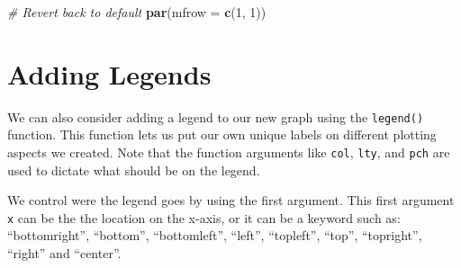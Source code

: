 \documentclass[
]{book}
\newenvironment{Shaded}{\begin{snugshade}}{\end{snugshade}}
\newcommand{\CommentTok}[1]{\textcolor[rgb]{0.56,0.35,0.01}{\textit{#1}}}
\newcommand{\DataTypeTok}[1]{\textcolor[rgb]{0.13,0.29,0.53}{#1}}
\newcommand{\DecValTok}[1]{\textcolor[rgb]{0.00,0.00,0.81}{#1}}
\newcommand{\KeywordTok}[1]{\textcolor[rgb]{0.13,0.29,0.53}{\textbf{#1}}}
\newcommand{\NormalTok}[1]{#1}
\newcommand{\OperatorTok}[1]{\textcolor[rgb]{0.81,0.36,0.00}{\textbf{#1}}}
\newcommand{\StringTok}[1]{\textcolor[rgb]{0.31,0.60,0.02}{#1}}
\begin{document}
\begin{Shaded}
\begin{Highlighting}[]
\CommentTok{# Revert back to default}
\KeywordTok{par}\NormalTok{(}\DataTypeTok{mfrow =} \KeywordTok{c}\NormalTok{(}\DecValTok{1}\NormalTok{, }\DecValTok{1}\NormalTok{))}
\end{Highlighting}
\end{Shaded}

\hypertarget{adding-legends}{%
\section{Adding Legends}\label{adding-legends}}

We can also consider adding a legend to our new graph using the \texttt{legend()} function. This function lets us put our own unique labels on different plotting aspects we created. Note that the function arguments like \texttt{col}, \texttt{lty}, and \texttt{pch} are used to dictate what should be on the legend.

We control were the legend goes by using the first argument. This first argument \texttt{x} can be the the location on the x-axis, or it can be a keyword such as: ``bottomright'', ``bottom'', ``bottomleft'', ``left'', ``topleft'', ``top'', ``topright'', ``right'' and ``center''.

\begin{Shaded}
\end{Shaded}
\end{document}
